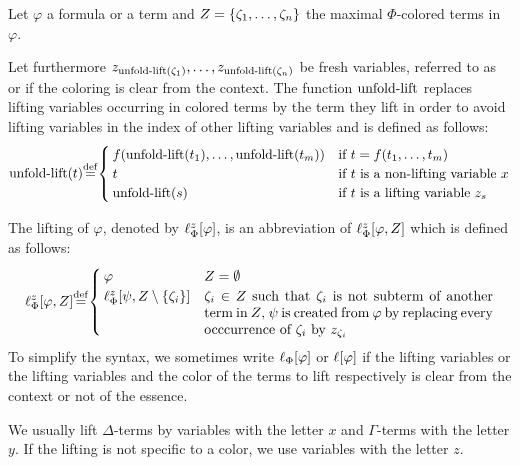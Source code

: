 \begin{defi}[Lifting]
	Let $\varphi$ a formula or a term and $Z=\{\zeta_{1}, \dotsc, \zeta_{n}\}$ the maximal $\Phi$-colored terms in $\varphi$.

	Let furthermore $z_{\operatorname{unfold-lift}(\zeta_{1})}, \ldots, z_{\operatorname{unfold-lift}(\zeta_{n})}$ be fresh variables, referred to as  or  if the coloring is clear from the context.
	The function $\operatorname{unfold-lift}$ replaces lifting variables occurring in colored terms by the term they lift in order to avoid lifting variables in the index of other lifting variables and is defined as follows:  
	\[\expa(t) \defeq \begin{cases}
			f(\expa(t_1),\dots, \expa(t_m)) & \text{if $t=f(t_1, \dots, t_m)$} \\
			t & \text{if $t$ is a non-lifting variable $x$} \\
			\expa(s) & \text{if $t$ is a lifting variable $z_s$}
	\end{cases}\]

	The lifting of $\varphi$, denoted by $\ell_{\Phi}^{z}[\varphi]$, is an abbreviation of 
	$\ell_{\Phi}^{z}[\varphi, Z]$ which is defined as follows:
	\[
		\lft{\Phi}{z}{\varphi, Z} \defeq
		\begin{cases}
			\varphi & Z = \emptyset \\
			\lft{\Phi}{z}{\psi, Z\setminus\{\colterm{i}\}} & \parbox[t]{0.6\linewidth}{$\colterm{i} \in Z$ such that $\colterm{i}$ is not subterm of another term in $Z$, $\psi$ is created from $\varphi$ by replacing every occcurrence of $\colterm{i}$ by $z_{\colterm{i}}$} 
		\end{cases}
	\]
	To simplify the syntax, we sometimes write $\ell_{\Phi}[\varphi]$ or $\ell[\varphi]$ if the lifting variables or the lifting variables and the color of the terms to lift respectively is clear from the context or not of the essence.
\end{defi}

We usually lift $\Delta$-terms by variables with the letter $x$ and $\Gamma$-terms with the letter $y$. If the lifting is not specific to a color, we use variables with the letter $z$.


